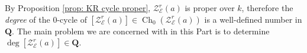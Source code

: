 \documentclass[reqno]{amsart}
\numberwithin{equation}{section}
\newcommand{\tony}[1]{{\color{blue} \sf
    $\spadesuit\spadesuit\spadesuit$ TONY: [#1]}}
\newcommand\mnote[1]{\marginpar{\tiny #1}}
\newcommand{\Q}{\mathbf{Q}}
\newcommand{\Cal}[1]{\mathcal{#1}}
\DeclareMathOperator{\Ch}{Ch}
\newcommand{\KR}[1]{\Cal{Z}_{\Cal{#1}}}
\newcommand{\WZ}[1]{{\color{blue} {#1}}}
\newcommand\op{\oplus}
\newcommand\cE{\mathcal{E}}
\newcommand\cL{\mathcal{L}}
\newcommand\cZ{\mathcal{Z}}
\newtheorem{prop}[thm]{Proposition}
\theoremstyle{remark}
\newtheorem{defn}[thm]{Definition}
\numberwithin{equation}{section}
\begin{document}



%




By Proposition \ref{prop: KR cycle proper}, $\cZ^{r}_{\cE}(a)$ is proper over $k$, 
therefore the {\em degree} of the $0$-cycle of $[\cZ^{r}_{\cE}(a)]\in \Ch_{0}(\cZ^r_{\cE}(a))$ is a well-defined  number in $\Q$.  The main problem we are concerned with in this Part is to determine $\deg [\KR{E}^r(a)] \in \Q$.







\end{document}
